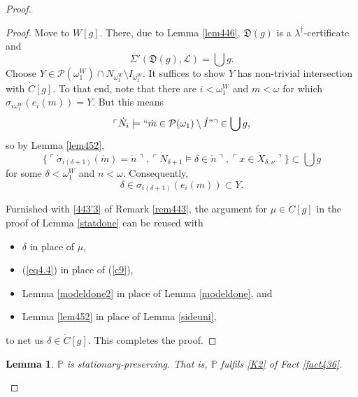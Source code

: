 \documentclass[12pt, twoside]{memoir}
\numberwithin{equation}{section}
\newtheorem{lem}[thm]{Lemma}
\theoremstyle{definition}
\theoremstyle{remark}
\theoremstyle{definition}
\theoremstyle{definition}
\theoremstyle{definition}
\theoremstyle{remark}
\begin{document}
\begin{proof}
\begin{proof}
Move to $W[g]$. There, due to Lemma \ref{lem446}, $\mathfrak{D}(g)$ is a $\lambda^{\dagger}$-certificate and
\begin{equation*}
    \Sigma'(\mathfrak{D}(g), \mathcal{L}) = \bigcup g \text{.}
\end{equation*}
Choose $Y \in \mathcal{P}(\omega_1^W) \cap N_{\omega_1^W} \setminus I_{\omega_1^W}$. It suffices to show $Y$ has non-trivial intersection with $\dot{C}[g]$. To that end, note that there are $i < \omega_1^W$ and $m < \omega$ for which $\sigma_{i\omega_1^W}(e_i(m)) = Y$. But this means
\begin{equation*}
    \ulcorner \dot{N}_i \models ``\dot{m} \in \mathcal{P}(\omega_1) \setminus \dot{I}" \urcorner \in \bigcup g \text{,}
\end{equation*}
so by Lemma \ref{lem452}, 
\begin{equation*}
    \{\ulcorner \dot{\sigma}_{i(\delta + 1)}(\dot{m}) = \dot{n} \urcorner, \ulcorner \dot{N}_{\delta + 1} \models \delta \in \dot{n} \urcorner, \ulcorner x \in \dot{X}_{\delta, \nu} \urcorner\} \subset \bigcup g
\end{equation*}
for some $\delta < \omega_1^W$ and $n < \omega$. Consequently, 
\begin{equation*}
    \delta \in \sigma_{i(\delta + 1)}(e_i(m)) \subset Y \text{.}
\end{equation*}

Furnished with \ref{443'3} of Remark \ref{rem443}, the argument for $\mu \in \dot{C}[g]$ in the proof of Lemma \ref{statdone} can be reused with 
\begin{itemize}
    \item $\delta$ in place of $\mu$, 
    \item (\ref{eq4.4}) in place of (\ref{c9}),
    \item Lemma \ref{modeldone2} in place of Lemma \ref{modeldone}, and
    \item Lemma \ref{lem452} in place of Lemma \ref{sideuni},
\end{itemize}
to net us $\delta \in \dot{C}[g]$. This completes the proof.
\end{proof}

\begin{lem}\label{lem454}
$\mathbb{P}$ is stationary-preserving. That is, $\mathbb{P}$ fulfils \ref{K2} of Fact \ref{fact436}.
\end{lem}


\end{proof}
\end{document}
